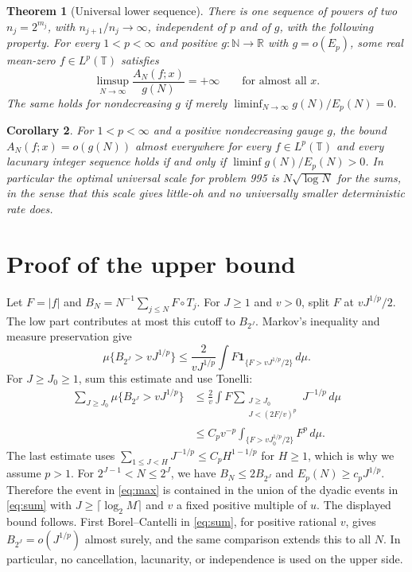 \documentclass[11pt]{article}
\newtheorem{theorem}{Theorem}
\newtheorem{corollary}[theorem]{Corollary}
\newcommand{\T}{\mathbb T}
\newcommand{\R}{\mathbb R}
\newcommand{\one}{\mathbf 1}
\begin{document}
\begin{theorem}[Universal lower sequence]\label{thm:lower}
There is one sequence of powers of two $n_j=2^{m_j}$, with $n_{j+1}/n_j\to\infty$, independent of $p$ and of $g$, with the following property. For every $1<p<\infty$ and positive $g:\mathbb N\to\R$ with $g=o(E_p)$, some real mean-zero $f\in L^p(\T)$ satisfies
\[
 \limsup_{N\to\infty}\frac{A_N(f;x)}{g(N)}=+\infty
 \qquad \text{for almost all \(x\)}.
 \tag{2}\label{eq:lower}
\]
The same holds for nondecreasing $g$ if merely $\liminf_{N\to\infty} g(N)/E_p(N)=0$.
\end{theorem}

\begin{corollary}
For $1<p<\infty$ and a positive nondecreasing gauge $g$, the bound $A_N(f;x)=o(g(N))$ almost everywhere for every $f\in L^p(\T)$ and every lacunary integer sequence holds if and only if $\liminf g(N)/E_p(N)>0$. In particular the optimal universal scale for problem 995 is $N\sqrt{\log N}$ for the sums, in the sense that this scale gives little-oh and no universally smaller deterministic rate does.
\end{corollary}

\section{Proof of the upper bound}
Let $F=|f|$ and $B_N=N^{-1}\sum_{j\le N} F\circ T_j$. For $J\ge1$ and $v>0$, split $F$ at $vJ^{1/p}/2$. The low part contributes at most this cutoff to $B_{2^J}$. Markov's inequality and measure preservation give
\[
 \mu\{B_{2^J}>vJ^{1/p}\}
 \le \frac{2}{vJ^{1/p}}\int F\one_{\{F>vJ^{1/p}/2\}}\,d\mu .
\]
For $J\ge J_0\ge1$, sum this estimate and use Tonelli:
\[
 \begin{aligned}
 \sum_{J\ge J_0}\mu\{B_{2^J}>vJ^{1/p}\}
 &\le \frac{2}{v}\int F
       \sum_{\substack{J\ge J_0\\J<(2F/v)^p}} J^{-1/p}\,d\mu\\
 &\le C_pv^{-p}\int_{\{F>vJ_0^{1/p}/2\}}F^p\,d\mu .
 \end{aligned}
 \tag{3}\label{eq:sum}
\]
The last estimate uses $\sum_{1\le J<H}J^{-1/p}\le C_p H^{1-1/p}$ for $H\ge1$, which is why we assume $p>1$. For $2^{J-1}<N\le 2^J$, we have $B_N\le2B_{2^J}$ and $E_p(N)\ge c_pJ^{1/p}$. Therefore the event in \eqref{eq:max} is contained in the union of the dyadic events in \eqref{eq:sum} with $J\ge \lceil\log_2 M\rceil$ and $v$ a fixed positive multiple of $u$. The displayed bound follows. First Borel--Cantelli in \eqref{eq:sum}, for positive rational $v$, gives $B_{2^J}=o(J^{1/p})$ almost surely, and the same comparison extends this to all $N$. In particular, no cancellation, lacunarity, or independence is used on the upper side.
\end{document}
